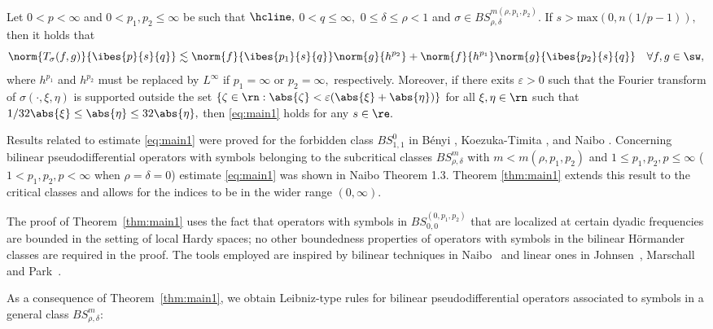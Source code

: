 \begin{theorem} \label{thm:main1}
Let $0<p<\infty$ and  $0<p_1,p_2\le \infty$ be such that $\hcline,$ $0<q\le \infty,$   $0\le\delta\le \rho<1$ and   $\sigma\in BS^{m(\rho,p_1,p_2)}_{\rho,\delta}.$ If $s>\text{max}(0,n(1/p - 1)),$ then it holds that
\begin{equation}\label{eq:main1}
\norm{T_\sigma(f,g)}{\ibes{p}{s}{q}}\lesssim \norm{f}{\ibes{p_1}{s}{q}}\norm{g}{h^{p_2}} +\norm{f}{h^{p_1}}\norm{g}{\ibes{p_2}{s}{q}}\quad \forall f,g\in \sw,
\end{equation}
where $h^{p_1}$ and $h^{p_2}$ must be replaced by $L^\infty$ if $p_1=\infty$ or $p_2=\infty,$ respectively. Moreover,  if there exits $\varepsilon>0$ such that the Fourier transform of  $\sigma(\cdot,\xi,\eta)$ is  supported outside the set  $\{\zeta\in\rn:\abs{\zeta}<\varepsilon (\abs{\xi}+\abs{\eta})\}$ for all  $\xi,\eta\in\rn$ such that $1/32\abs{\xi}\le \abs{\eta}\le 32 \abs{\eta},$ then \eqref{eq:main1} holds for any $s\in\re.$
\end{theorem}

Results related to estimate \ref{eq:main1} were proved for the forbidden class $BS^0_{1,1}$ in B\'enyi \cite{MR1996120}, Koezuka-Timita \cite{MR3750316}, and Naibo \citep{MR3393696}. Concerning bilinear pseudodifferential operators with symbols belonging to the subcritical classes $BS^m_{\rho,\delta}$ with $m<m(\rho,p_1,p_2)$ and $1\leq p_1,p_2,p \leq \infty$ ($1 < p_1,p_2,p < \infty$ when $\rho = \delta = 0$) estimate \ref{eq:main1} was shown in Naibo \citep{MR3393696} Theorem 1.3. Theorem \ref{thm:main1} extends this result to the critical classes and allows for the indices to be in the wider range $(0,\infty)$. 

The proof of Theorem~\ref{thm:main1} uses the fact that operators with symbols in $BS^{(0,p_1,p_2)}_{0,0}$ that are localized at certain dyadic frequencies are bounded in the setting of local Hardy spaces; no other boundedness properties of operators with symbols in the bilinear H\"ormander classes are required in the proof. The tools employed are inspired by bilinear techniques in Naibo~\cite{MR3393696} and linear ones in   Johnsen~\cite{MR2163627}, Marschall~\cite{MR1376592} and   Park~\cite{Park}.

As a consequence of Theorem~\ref{thm:main1}, we obtain  Leibniz-type rules for bilinear pseudodifferential operators associated to symbols in a general class $BS^m_{\rho,\delta}:$

